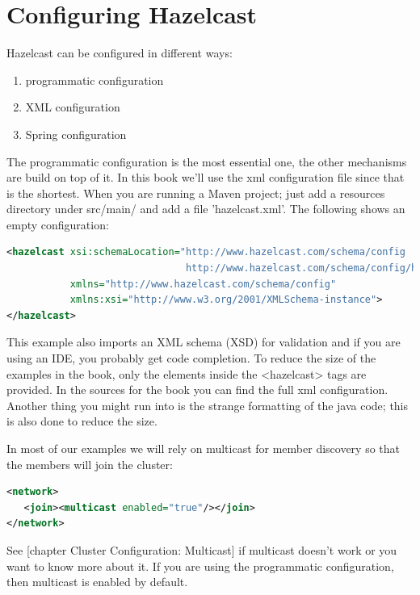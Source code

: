 \section{Configuring Hazelcast}
Hazelcast can be configured in different ways:
\begin{enumerate}
\item programmatic configuration
\item XML configuration 
\item Spring configuration
\end{enumerate}
The programmatic configuration is the most essential one, the other mechanisms are build on top of it. In this book we'll use the xml configuration file since that is the shortest. When you are running a Maven project; just add a resources directory under src/main/ and add a file 'hazelcast.xml'. The following shows an empty configuration:
\begin{lstlisting}[language=xml]
<hazelcast xsi:schemaLocation="http://www.hazelcast.com/schema/config
                               http://www.hazelcast.com/schema/config/hazelcast-config-3.0.xsd"
           xmlns="http://www.hazelcast.com/schema/config"
           xmlns:xsi="http://www.w3.org/2001/XMLSchema-instance">
</hazelcast>
\end{lstlisting}
This example also imports an XML schema (XSD) for validation and if you are using an IDE, you probably get code completion. To reduce the size of the examples in the book, only the elements inside the <hazelcast> tags are provided. In the sources for the book you can find the full xml configuration. Another thing you might run into is the strange formatting of the java code; this is also done to reduce the size. 

In most of our examples we will rely on multicast for member discovery so that the members will join the cluster:
\begin{lstlisting}[language=xml]
<network>
   <join><multicast enabled="true"/></join>
</network>
\end{lstlisting}
See [chapter Cluster Configuration: Multicast] if multicast doesn't work or you want to know more about it. If you are using the programmatic configuration, then multicast is enabled by default.

